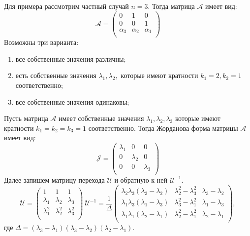 Для примера рассмотрим частный случай $n=3.$ Тогда матрица $\mathcal{A}$ имеет вид:
$$
 \mathcal{A} = 
 \begin{pmatrix}
  0 & 1 & 0\\
  0 & 0 & 1 \\
  \alpha_3 & \alpha_2 & \alpha_1 \\
 \end{pmatrix}
$$
Возможны три варианта:
\begin{enumerate} [\quad 1)]
\item все собственные значения различны;
\item есть собственные значения $\lambda_1, \lambda_2,$ которые имеют кратности $k_1=2, k_2=1$ соответственно; 
\item все собственные значения одинаковы;        
\end{enumerate}

Пусть матрица $\mathcal{A}$ имеет собственные значения $\lambda_1, \lambda_2, \lambda_3$ которые имеют кратности $k_1=k_2=k_3=1$ соответственно. Тогда Жорданова форма матрицы $\mathcal{A}$ имеет вид:
$$
 \mathcal{J} = 
 \begin{pmatrix}
  \lambda_1 & 0 & 0\\
  0 & \lambda_2 & 0 \\
  0 & 0 & \lambda_3 \\
 \end{pmatrix}
$$
Далее запишем матрицу перехода $\mathcal{U}$ и обратную к ней $\mathcal{U}^{-1}.$
$$
 \mathcal{U} = 
 \begin{pmatrix}
  1 & 1 & 1\\
  \lambda_1 & \lambda_2 & \lambda_3 \\
  \lambda_1^2 & \lambda_2^2 & \lambda_3^2 \\
 \end{pmatrix}
\  \mathcal{U}^{-1} = \frac{1}{\Delta} 
 \begin{pmatrix}
  \lambda_2\lambda_3(\lambda_3-\lambda_2) & \lambda_2^2-\lambda_3^2 & \lambda_3-\lambda_2\\
  \lambda_1\lambda_3(\lambda_1-\lambda_3) & \lambda_3^2-\lambda_1^2 & \lambda_1-\lambda_3\\
  \lambda_1\lambda_1(\lambda_2-\lambda_1) & \lambda_2^2-\lambda_1^2 & \lambda_2-\lambda_1\\
 \end{pmatrix},
$$
где $\Delta = (\lambda_3-\lambda_1)(\lambda_3-\lambda_2)(\lambda_2-\lambda_1).$